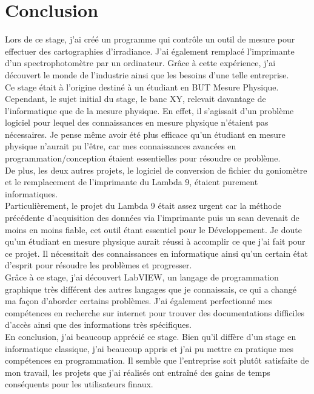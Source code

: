 \documentclass[12pt]{article}
\begin{document}
\newpage
\section{ Conclusion }


Lors de ce stage, j'ai créé un programme qui contrôle un outil de mesure pour effectuer des cartographies d'irradiance.
J'ai également remplacé l'imprimante d'un spectrophotomètre par un ordinateur.
Grâce à cette expérience, j'ai découvert le monde de l'industrie ainsi que les besoins d'une telle entreprise.\\
Ce stage était à l'origine destiné à un étudiant en BUT Mesure Physique. Cependant, le sujet initial du stage, le banc XY, relevait davantage de l'informatique que de la mesure physique.
En effet, il s'agissait d'un problème logiciel pour lequel des connaissances en mesure physique n'étaient pas nécessaires.
Je pense même avoir été plus efficace qu'un étudiant en mesure physique n'aurait pu l'être, car mes connaissances avancées en programmation/conception étaient essentielles pour résoudre ce problème.\\
De plus, les deux autres projets, le logiciel de conversion de fichier du goniomètre et le remplacement de l'imprimante du Lambda 9, étaient purement informatiques.\\
Particulièrement, le projet du Lambda 9 était assez urgent car la méthode précédente d'acquisition des données via l'imprimante puis un scan devenait de moins en moins fiable, cet outil étant essentiel pour le Développement.
Je doute qu'un étudiant en mesure physique aurait réussi à accomplir ce que j'ai fait pour ce projet.
Il nécessitait des connaissances en informatique ainsi qu'un certain état d'esprit pour résoudre les problèmes et progresser.\\
Grâce à ce stage, j'ai découvert LabVIEW, un langage de programmation graphique très différent des autres langages que je connaissais, ce qui a changé ma façon d'aborder certains problèmes.
J'ai également perfectionné mes compétences en recherche sur internet pour trouver des documentations difficiles d'accès ainsi que des informations très spécifiques.\\
En conclusion, j'ai beaucoup apprécié ce stage. Bien qu'il diffère d'un stage en informatique classique, j'ai beaucoup appris et j'ai pu mettre en pratique mes compétences en programmation.
Il semble que l'entreprise soit plutôt satisfaite de mon travail, les projets que j'ai réalisés ont entraîné des gains de temps conséquents pour les utilisateurs finaux.

\newpage
\printglossaries
\end{document}
